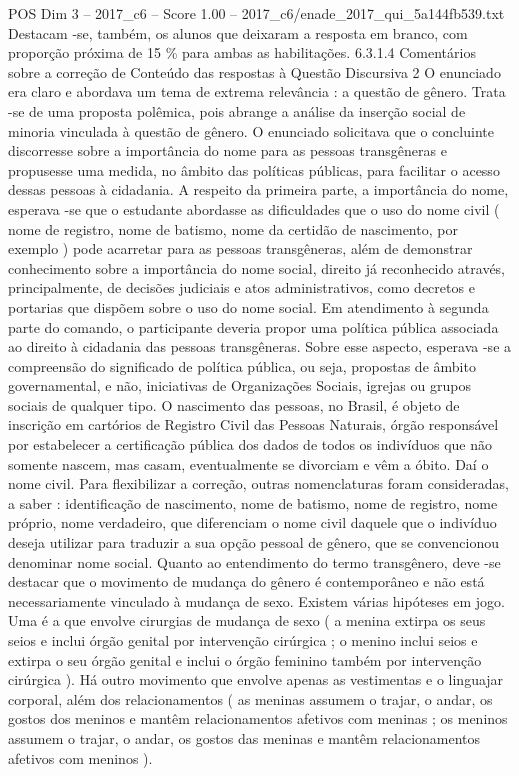\begin{textsample}{POS Dim 3 – 2017\_c6 – Score 1.00 – 2017\_c6/enade\_2017\_qui\_5a144fb539.txt}
Destacam -se, também, os alunos que deixaram a resposta em branco, com proporção próxima de 15 \% para ambas as habilitações. 6.3.1.4 Comentários sobre a correção de Conteúdo das respostas à Questão Discursiva 2 O enunciado era claro e abordava um tema de extrema relevância : a questão de gênero.
Trata -se de uma proposta polêmica, pois abrange a análise da inserção social de minoria vinculada à questão de gênero.
O enunciado solicitava que o concluinte discorresse sobre a importância do nome para as pessoas transgêneras e propusesse uma medida, no âmbito das políticas públicas, para facilitar o acesso dessas pessoas à cidadania.
A respeito da primeira parte, a importância do nome, esperava -se que o estudante abordasse as dificuldades que o uso do nome civil ( nome de registro, nome de batismo, nome da certidão de nascimento, por exemplo ) pode acarretar para as pessoas transgêneras, além de demonstrar conhecimento sobre a importância do nome social, direito já reconhecido através, principalmente, de decisões judiciais e atos administrativos, como decretos e portarias que dispõem sobre o uso do nome social.
Em atendimento à segunda parte do comando, o participante deveria propor uma política pública associada ao direito à cidadania das pessoas transgêneras.
Sobre esse aspecto, esperava -se a compreensão do significado de política pública, ou seja, propostas de âmbito governamental, e não, iniciativas de Organizações Sociais, igrejas ou grupos sociais de qualquer tipo.
O nascimento das pessoas, no Brasil, é objeto de inscrição em cartórios de Registro Civil das Pessoas Naturais, órgão responsável por estabelecer a certificação pública dos dados de todos os indivíduos que não somente nascem, mas casam, eventualmente se divorciam e vêm a óbito.
Daí o nome civil.
Para flexibilizar a correção, outras nomenclaturas foram consideradas, a saber : identificação de nascimento, nome de batismo, nome de registro, nome próprio, nome verdadeiro, que diferenciam o nome civil daquele que o indivíduo deseja utilizar para traduzir a sua opção pessoal de gênero, que se convencionou denominar nome social.
Quanto ao entendimento do termo transgênero, deve -se destacar que o movimento de mudança do gênero é contemporâneo e não está necessariamente vinculado à mudança de sexo.
Existem várias hipóteses em jogo.
Uma é a que envolve cirurgias de mudança de sexo ( a menina extirpa os seus seios e inclui órgão genital por intervenção cirúrgica ; o menino inclui seios e extirpa o seu órgão genital e inclui o órgão feminino também por intervenção cirúrgica ).
Há outro movimento que envolve apenas as vestimentas e o linguajar corporal, além dos relacionamentos ( as meninas assumem o trajar, o andar, os gostos dos meninos e mantêm relacionamentos afetivos com meninas ; os meninos assumem o trajar, o andar, os gostos das meninas e mantêm relacionamentos afetivos com meninos ).

\end{textsample}
